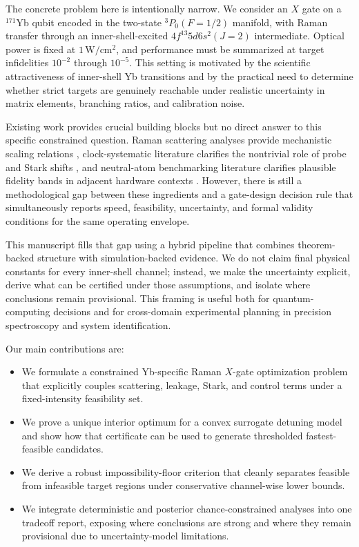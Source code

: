 \documentclass{article} %
\begin{document}
The concrete problem here is intentionally narrow. We consider an $X$ gate on a $^{171}$Yb qubit encoded in the two-state $^3P_0(F=1/2)$ manifold, with Raman transfer through an inner-shell-excited $4f^{13}5d6s^2(J=2)$ intermediate. Optical power is fixed at $1\,\mathrm{W/cm^2}$, and performance must be summarized at target infidelities $10^{-2}$ through $10^{-5}$. This setting is motivated by the scientific attractiveness of inner-shell Yb transitions \citep{S01,S02,S06} and by the practical need to determine whether strict targets are genuinely reachable under realistic uncertainty in matrix elements, branching ratios, and calibration noise.

Existing work provides crucial building blocks but no direct answer to this specific constrained question. Raman scattering analyses provide mechanistic scaling relations \citep{S11,S12}, clock-systematic literature clarifies the nontrivial role of probe and Stark shifts \citep{S09,S10,S16}, and neutral-atom benchmarking literature clarifies plausible fidelity bands in adjacent hardware contexts \citep{S13,S14,S15}. However, there is still a methodological gap between these ingredients and a gate-design decision rule that simultaneously reports speed, feasibility, uncertainty, and formal validity conditions for the same operating envelope.

This manuscript fills that gap using a hybrid pipeline that combines theorem-backed structure with simulation-backed evidence. We do not claim final physical constants for every inner-shell channel; instead, we make the uncertainty explicit, derive what can be certified under those assumptions, and isolate where conclusions remain provisional. This framing is useful both for quantum-computing decisions and for cross-domain experimental planning in precision spectroscopy and system identification.

Our main contributions are:
\begin{itemize}
\item We formulate a constrained Yb-specific Raman $X$-gate optimization problem that explicitly couples scattering, leakage, Stark, and control terms under a fixed-intensity feasibility set.
\item We prove a unique interior optimum for a convex surrogate detuning model and show how that certificate can be used to generate thresholded fastest-feasible candidates.
\item We derive a robust impossibility-floor criterion that cleanly separates feasible from infeasible target regions under conservative channel-wise lower bounds.
\item We integrate deterministic and posterior chance-constrained analyses into one tradeoff report, exposing where conclusions are strong and where they remain provisional due to uncertainty-model limitations.
\end{itemize}
\end{document}
